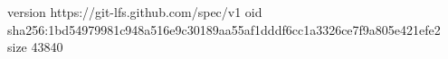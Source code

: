 version https://git-lfs.github.com/spec/v1
oid sha256:1bd54979981c948a516e9c30189aa55af1dddf6cc1a3326ce7f9a805e421efe2
size 43840
